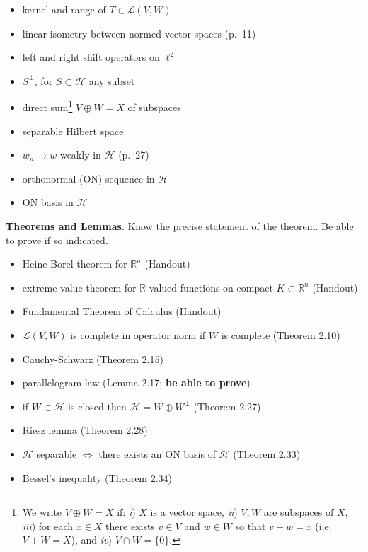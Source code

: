 \documentclass[12pt]{amsart}
\newcommand{\normalspacing}{\renewcommand{\baselinestretch}{1.1}\tiny\normalsize}
\newcommand{\cH}{\mathcal{H}}
\newcommand{\cL}{\mathcal{L}}
\newcommand{\RR}{{\mathbb{R}}}
\begin{document}
\begin{itemize}
\item kernel and range of $T \in \cL(V,W)$
\item linear isometry between normed vector spaces (p.~11)
\item left and right shift operators on $\ell^2$
\item $S^\perp$, for $S\subset \cH$ any subset
\item direct sum\footnote{We write $V\oplus W=X$ if: \quad \emph{i}) $X$ is a vector space, \emph{ii}) $V,W$ are subspaces of $X$, \emph{iii}) for each $x\in X$ there exists $v\in V$ and $w\in W$ so that $v+w=x$ (i.e.~$V+W=X$), and \emph{iv}) $V\cap W = \{0\}$.} $V\oplus W=X$ of subspaces
\item separable Hilbert space
\item $w_n \to w$ weakly in $\cH$ (p.~27)
\item orthonormal (ON) sequence in $\cH$
\item ON basis in $\cH$
\end{itemize}

\normalspacing
\medskip
\noindent \textbf{Theorems and Lemmas}.  Know the precise statement of the theorem.  Be able to prove if so indicated.
\begin{itemize}
\item Heine-Borel theorem for $\RR^n$ (Handout)
\item extreme value theorem for $\RR$-valued functions on compact $K\subset \RR^n$ (Handout)
\item Fundamental Theorem of Calculus (Handout)
\item $\cL(V,W)$ is complete in operator norm if $W$ is complete (Theorem 2.10)
\item Cauchy-Schwarz (Theorem 2.15)
\item parallelogram law (Lemma 2.17; \textbf{be able to prove})
\item if $W\subset \cH$ is closed then $\cH = W\oplus W^\perp$ (Theorem 2.27)
\item Riesz lemma (Theorem 2.28)
\item $\cH$ separable $\iff$ there exists an ON basis of $\cH$ (Theorem 2.33)
\item Bessel's inequality (Theorem 2.34)
\end{itemize}
\end{document}
